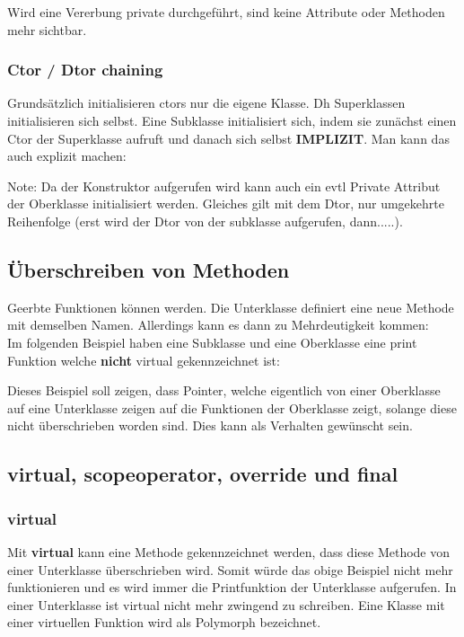 Wird eine Vererbung private durchgeführt, sind keine Attribute oder Methoden mehr sichtbar.

\subsubsection{Ctor / Dtor chaining}

Grundsätzlich initialisieren ctors nur die eigene Klasse. 
Dh Superklassen initialisieren sich selbst. 
Eine Subklasse initialisiert sich, indem sie zunächst einen Ctor der Superklasse aufruft und danach sich selbst \textbf{IMPLIZIT}. 
Man kann das auch explizit machen:



Note: Da der Konstruktor aufgerufen wird kann auch ein evtl Private Attribut der Oberklasse initialisiert werden.
Gleiches gilt mit dem Dtor, nur umgekehrte Reihenfolge (erst wird der Dtor von der subklasse aufgerufen, dann.....).

\subsection{Überschreiben von Methoden}

Geerbte Funktionen können  werden. 
Die Unterklasse definiert eine neue Methode mit demselben Namen.
Allerdings kann es dann zu Mehrdeutigkeit kommen:\\
Im folgenden Beispiel haben eine Subklasse und eine Oberklasse eine print Funktion welche \textbf{nicht} virtual gekennzeichnet ist:



Dieses Beispiel soll zeigen, dass Pointer, welche eigentlich von einer Oberklasse auf eine Unterklasse zeigen auf die  Funktionen der Oberklasse zeigt, solange diese nicht überschrieben worden sind.
Dies kann als Verhalten gewünscht sein. 

\subsection{virtual, scopeoperator, override und final}

\subsubsection{virtual}\label{Virtual}

Mit \textbf{virtual} kann eine Methode gekennzeichnet werden, dass diese Methode von einer Unterklasse überschrieben wird.
Somit würde das obige Beispiel nicht mehr funktionieren und es wird immer die Printfunktion der Unterklasse aufgerufen. 
In einer Unterklasse ist virtual nicht mehr zwingend zu schreiben.
Eine Klasse mit einer virtuellen Funktion wird als Polymorph bezeichnet.

